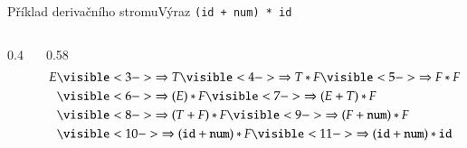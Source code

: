 \documentclass[11pt,professionalfont,aspectratio=43]{beamer}
\begin{document}
    \begin{frame}{Příklad derivačního stromu}{Výraz \texttt{(id + num) * id}}

        \begin{columns}[T,onlytextwidth]
            \begin{column}{0.4\textwidth}
            \end{column}

            \begin{column}{0.58\textwidth}
                \begin{align*}
                    E
                    &\visible<3->{\Rightarrow T}
                    \visible<4->{\Rightarrow T * F}
                    \visible<5->{\Rightarrow F * F} \\
                    &\visible<6->{\Rightarrow (E) * F}
                    \visible<7->{\Rightarrow (E + T) * F} \\
                    &\visible<8->{\Rightarrow (T + F) * F}
                    \visible<9->{\Rightarrow (F + \mathtt{num}) * F} \\
                    &\visible<10->{\Rightarrow (\mathtt{id} + \mathtt{num}) * F}
                    \visible<11->{\Rightarrow (\mathtt{id} + \mathtt{num}) * \mathtt{id}}
                \end{align*}

            \end{column}
        \end{columns}

    \end{frame}
\end{document}
